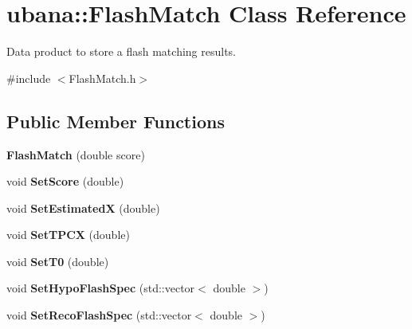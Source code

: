 \hypertarget{classubana_1_1FlashMatch}{\section{ubana\-:\-:\-Flash\-Match \-Class \-Reference}
\label{classubana_1_1FlashMatch}
}


\-Data product to store a flash matching results.  




{\ttfamily \#include $<$\-Flash\-Match.\-h$>$}

\subsection*{\-Public \-Member \-Functions}
\begin{DoxyCompactItemize}
\item 
\hypertarget{classubana_1_1FlashMatch_ac6dac027acf7a820fed8b77b79983eef}{{\bfseries \-Flash\-Match} (double score)}\label{classubana_1_1FlashMatch_ac6dac027acf7a820fed8b77b79983eef}

\item 
\hypertarget{classubana_1_1FlashMatch_a914461ed5856c4dd6efd4b802a99e694}{void {\bfseries \-Set\-Score} (double)}\label{classubana_1_1FlashMatch_a914461ed5856c4dd6efd4b802a99e694}

\item 
\hypertarget{classubana_1_1FlashMatch_a75b780b23d3f90bbd87d92e13c2a9d65}{void {\bfseries \-Set\-Estimated\-X} (double)}\label{classubana_1_1FlashMatch_a75b780b23d3f90bbd87d92e13c2a9d65}

\item 
\hypertarget{classubana_1_1FlashMatch_ae68bce2f79738dbc0867f3fb76277f7c}{void {\bfseries \-Set\-T\-P\-C\-X} (double)}\label{classubana_1_1FlashMatch_ae68bce2f79738dbc0867f3fb76277f7c}

\item 
\hypertarget{classubana_1_1FlashMatch_a377ea80205d325f2605a341379fe2539}{void {\bfseries \-Set\-T0} (double)}\label{classubana_1_1FlashMatch_a377ea80205d325f2605a341379fe2539}

\item 
\hypertarget{classubana_1_1FlashMatch_aee49ac7698634e3e59b8b489dd6cc993}{void {\bfseries \-Set\-Hypo\-Flash\-Spec} (std\-::vector$<$ double $>$)}\label{classubana_1_1FlashMatch_aee49ac7698634e3e59b8b489dd6cc993}

\item 
\hypertarget{classubana_1_1FlashMatch_a1d5970b7af75cc887dba190af9388ae5}{void {\bfseries \-Set\-Reco\-Flash\-Spec} (std\-::vector$<$ double $>$)}\label{classubana_1_1FlashMatch_a1d5970b7af75cc887dba190af9388ae5}


\end{DoxyCompactItemize}
